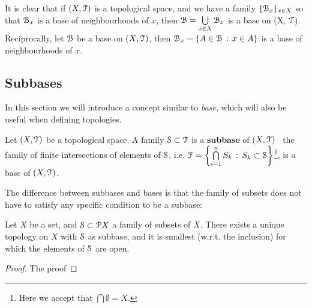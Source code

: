It is clear that if $(X,\T)$ is a topological space, and we have a family 
$\{\B_x\}_{x\in X}$ so that $\B_x$ is a base of neighbourhoods of $x$, then 
$\B=\bigcup\limits_{x\in X}\B_x$ is a base on (X, $\T$).
Reciprocally, let $\B$ be a base on $(X, \T)$, then $\B_x = \setdef{A\in\B}{x\in A}$ is
a base of neighbourhoods of $x$.

\subsection{Subbases}\label{subsec:subbases}

In this section we will introduce a concept similar to \emph{base}, which will also be 
useful when defining topologies.

\begin{definition}
	\label{def:subbase}
	Let $(X, \T)$ be a topological space. A family $\S\subset \T$ is a \textbf{subbase} 
	of $(X, \T)$ \iff\ the family of finite intersections of elements of $\S$,  i.e. $\F 
	= \setdef{\bigcap\limits_{i=1}^nS_k}{S_k\subset \S}$\footnote{Here we accept that 
		$\bigcap \emptyset = X$.}, is a base of $(X, \T)$.
\end{definition}

The difference between subbases and bases is that the family of subsets does not have 
to satisfy any specific condition to be a subbase:

\begin{theorem}
	Let $X$ be a set, and $\S\subset \P X$ a family of subsets of $X$.
	There exists a unique topology on $X$ with $\S$ as subbase, and it is smallest
	(w.r.t. the inclusion) for which the elements of $\S$ are open.
\end{theorem}

\begin{proof}
	The proof
\end{proof}
